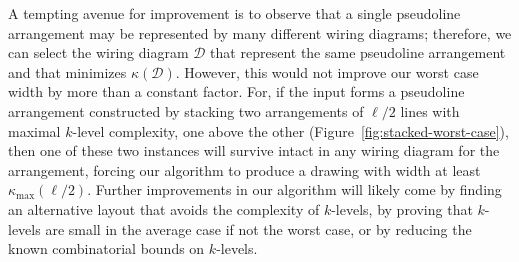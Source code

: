 \documentclass[oribibl]{llncs}
\newcommand{\klevel}{\kappa}
\newcommand{\maxklevel}{\kappa_{\max}}
\begin{document}
A tempting avenue for improvement is to observe that a single pseudoline arrangement may be represented by many different wiring diagrams; therefore, we can select the wiring diagram $\mathcal{D}$ that represent the same pseudoline arrangement and that minimizes $\klevel({\mathcal{D}})$. However, this would not improve our worst case width by more than a constant factor. For, if the input forms a pseudoline arrangement constructed by stacking two arrangements of $\ell/2$ lines with maximal $k$-level complexity, one above the other (Figure~\ref{fig:stacked-worst-case}), then one of these two instances will survive intact in any wiring diagram for the arrangement, forcing our algorithm to produce a drawing with width at least $\maxklevel(\ell/2)$. Further improvements in our algorithm will likely come by finding an alternative layout that avoids the complexity of $k$-levels, by proving that $k$-levels are small in the average case if not the worst case, or by reducing the known combinatorial bounds on $k$-levels.

{\raggedright

}
\end{document}
